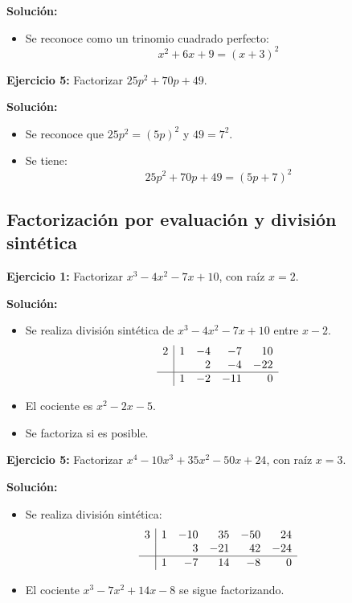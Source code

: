 \documentclass{profesor}
\begin{document}
\textbf{Solución:}
\begin{itemize}
    \item Se reconoce como un trinomio cuadrado perfecto:
    \[
    x^2 + 6x + 9 = (x + 3)^2
    \]
\end{itemize}

\textbf{Ejercicio 5:}  
Factorizar \( 25p^2 + 70p + 49 \).

\textbf{Solución:}
\begin{itemize}
    \item Se reconoce que \( 25p^2 = (5p)^2 \) y \( 49 = 7^2 \).
    \item Se tiene:
    \[
    25p^2 + 70p + 49 = (5p + 7)^2
    \]
\end{itemize}

\subsection{Factorización por evaluación y división sintética}
\textbf{Ejercicio 1:}  
Factorizar \( x^3 - 4x^2 - 7x + 10 \), con raíz \( x = 2 \).

\textbf{Solución:}
\begin{itemize}
    \item Se realiza división sintética de \( x^3 - 4x^2 - 7x + 10 \) entre \( x - 2 \).
    \[
    \begin{array}{r|rrrr}
    2 & 1 & -4 & -7 & 10  \\
      &   & 2  & -4 & -22 \\
    \hline
      & 1 & -2  & -11 & 0 \\
    \end{array}
    \]
    \item El cociente es \( x^2 - 2x - 5 \).
    \item Se factoriza si es posible.
\end{itemize}

\textbf{Ejercicio 5:}  
Factorizar \( x^4 - 10x^3 + 35x^2 - 50x + 24 \), con raíz \( x = 3 \).

\textbf{Solución:}
\begin{itemize}
    \item Se realiza división sintética:
    \[
    \begin{array}{r|rrrrr}
    3 & 1 & -10 & 35 & -50 & 24  \\
      &   & 3  & -21 & 42 & -24 \\
    \hline
      & 1 & -7  & 14  & -8  & 0 \\
    \end{array}
    \]
    \item El cociente \( x^3 - 7x^2 + 14x - 8 \) se sigue factorizando.
\end{itemize}
\end{document}

